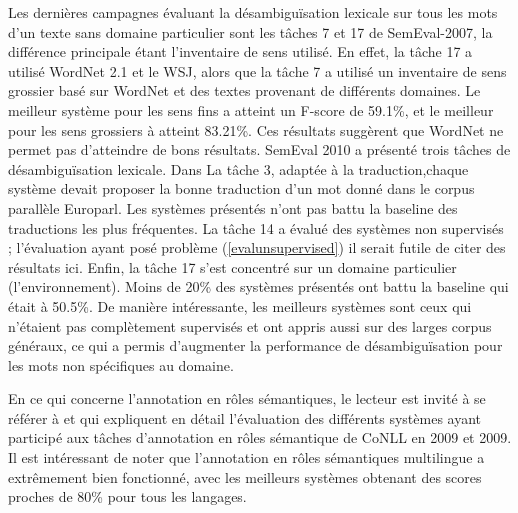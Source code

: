 Les dernières campagnes évaluant la désambiguïsation lexicale sur tous les mots
d'un texte sans domaine particulier sont les tâches 7 et 17 de SemEval-2007, la
différence principale étant l'inventaire de sens utilisé. En effet, la tâche 17
a utilisé WordNet 2.1 et le WSJ, alors que la tâche 7 a utilisé un inventaire
de sens grossier basé sur WordNet et des textes provenant de différents
domaines. Le meilleur système pour les sens fins a atteint un F-score de
59.1\%, et le meilleur pour les sens grossiers à atteint 83.21\%. Ces résultats
suggèrent que WordNet ne permet pas d'atteindre de bons résultats. SemEval 2010
a présenté trois tâches de désambiguïsation lexicale. Dans La tâche 3, adaptée
à la traduction,chaque système devait proposer la bonne traduction d'un mot
donné dans le corpus parallèle Europarl. Les systèmes présentés n'ont pas battu
la baseline des traductions les plus fréquentes. La tâche 14 a évalué des
systèmes non supervisés ; l'évaluation ayant posé problème
(\ref{evalunsupervised}) il serait futile de citer des résultats ici. Enfin, la
tâche 17 s'est concentré sur un domaine particulier (l'environnement). Moins de
20\% des systèmes présentés ont battu la baseline qui était à 50.5\%. De
manière intéressante, les meilleurs systèmes sont ceux qui n'étaient pas
complètement supervisés et ont appris aussi sur des larges corpus généraux, ce
qui a permis d'augmenter la performance de désambiguïsation pour les mots non
spécifiques au domaine.

En ce qui concerne l'annotation en rôles sémantiques, le lecteur est invité à
se référer à \citep{surdeanu2008conll} et \citep{hajic2009conll} qui expliquent
en détail l'évaluation des différents systèmes ayant participé aux tâches
d'annotation en rôles sémantique de CoNLL en 2009 et 2009. Il est intéressant
de noter que l'annotation en rôles sémantiques multilingue a extrêmement bien
fonctionné, avec les meilleurs systèmes obtenant des scores proches de 80\%
pour tous les langages.


